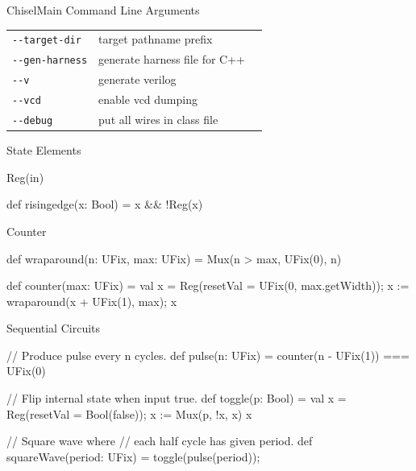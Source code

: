 \documentclass[xcolor=pdflatex,dvipsnames,table]{beamer}
\begin{document}
\begin{frame}[fragile]{ChiselMain Command Line Arguments}
\begin{tabular}{lll}
\verb+--target-dir+ & target pathname prefix \\
\verb+--gen-harness+ & generate harness file for C++ \\
\verb+--v+ & generate verilog \\
\verb+--vcd+ & enable vcd dumping \\
\verb+--debug+ & put all wires in class file \\
\end{tabular}
\end{frame}


\begin{frame}[fragile]{State Elements}

\begin{scala}
Reg(in)
\end{scala}

\begin{scala}
def risingedge(x: Bool) = x && !Reg(x)
\end{scala}

\end{frame}

\begin{frame}[fragile]{Counter}

\begin{scala}
def wraparound(n: UFix, max: UFix) =
  Mux(n > max, UFix(0), n)

def counter(max: UFix) = {
  val x = Reg(resetVal = UFix(0, max.getWidth));
  x := wraparound(x + UFix(1), max);
  x
}
\end{scala}

\end{frame}

\begin{frame}[fragile]{Sequential Circuits}

\begin{scala}
// Produce pulse every n cycles.
def pulse(n: UFix) = 
  counter(n - UFix(1)) === UFix(0)
\end{scala}

\begin{scala}
// Flip internal state when input true.
def toggle(p: Bool) = {
  val x = Reg(resetVal = Bool(false));
  x := Mux(p, !x, x)
  x
}

// Square wave where 
// each half cycle has given period.
def squareWave(period: UFix) = 
  toggle(pulse(period));
\end{scala}

\end{frame}
\end{document}
